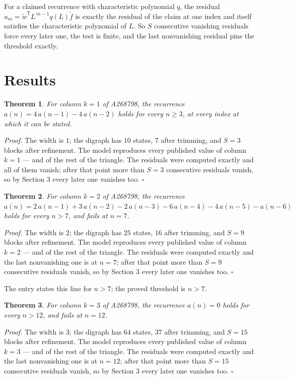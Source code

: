 \documentclass[11pt]{article}
\newtheorem{theorem}{Theorem}
\theoremstyle{definition}
\begin{document}
For a claimed recurrence with characteristic polynomial $q$, the residual $u_m = \tilde w^{\mathsf T}L^{\,m-1}q(L)\tilde f$ is exactly the residual of the claim at one index and itself satisfies the characteristic polynomial of $L$. So $S$ consecutive vanishing residuals force every later one, the test is finite, and the last nonvanishing residual pins the threshold exactly.

\section{Results}

\begin{theorem} For column $k = 1$ of A268798, the recurrence $a(n) = 4\,a(n-1) - 4\,a(n-2)$ holds for every $n \ge 3$, at every index at which it can be stated.\end{theorem}

{\itshape Proof.} The width is $1$; the digraph has $10$ states, $7$ after trimming, and $S = 3$ blocks after refinement. The model reproduces every published value of column $k = 1$ --- and of the rest of the triangle. The residuals were computed exactly and all of them vanish; after that point more than $S = 3$ consecutive residuals vanish, so by Section 3 every later one vanishes too. $\square$

\begin{theorem} For column $k = 2$ of A268798, the recurrence $a(n) = 2\,a(n-1) + 3\,a(n-2) - 2\,a(n-3) - 6\,a(n-4) - 4\,a(n-5) - a(n-6)$ holds for every $n > 7$, and fails at $n = 7$.\end{theorem}

{\itshape Proof.} The width is $2$; the digraph has $25$ states, $16$ after trimming, and $S = 9$ blocks after refinement. The model reproduces every published value of column $k = 2$ --- and of the rest of the triangle. The residuals were computed exactly and the last nonvanishing one is at $n = 7$; after that point more than $S = 9$ consecutive residuals vanish, so by Section 3 every later one vanishes too. $\square$

The entry states this line for $n > 7$; the proved threshold is $n > 7$.

\begin{theorem} For column $k = 3$ of A268798, the recurrence $a(n) = 0$ holds for every $n > 12$, and fails at $n = 12$.\end{theorem}

{\itshape Proof.} The width is $3$; the digraph has $64$ states, $37$ after trimming, and $S = 15$ blocks after refinement. The model reproduces every published value of column $k = 3$ --- and of the rest of the triangle. The residuals were computed exactly and the last nonvanishing one is at $n = 12$; after that point more than $S = 15$ consecutive residuals vanish, so by Section 3 every later one vanishes too. $\square$
\end{document}
